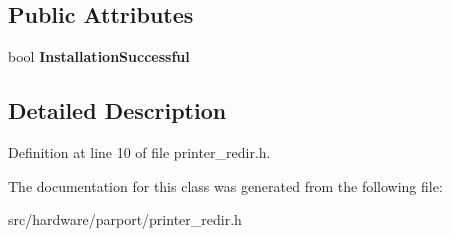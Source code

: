\subsection*{Public Attributes}
\begin{DoxyCompactItemize}
\item 
\hypertarget{classCPrinterRedir_af99ff7462e2f5411dc7d26edb7203a73}{bool {\bfseries Installation\-Successful}}\label{classCPrinterRedir_af99ff7462e2f5411dc7d26edb7203a73}

\end{DoxyCompactItemize}


\subsection{Detailed Description}


Definition at line 10 of file printer\-\_\-redir.\-h.



The documentation for this class was generated from the following file\-:\begin{DoxyCompactItemize}
\item 
src/hardware/parport/printer\-\_\-redir.\-h\end{DoxyCompactItemize}
